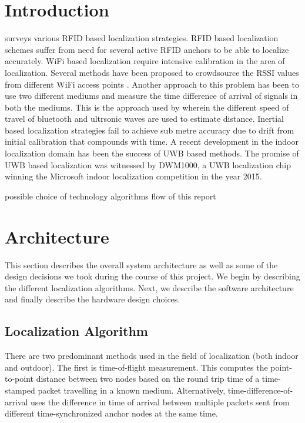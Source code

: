 \documentclass[journal,transmag]{IEEEtran}
\begin{document}
\section{Introduction}

\cite{bouet2008rfid} surveys various RFID based localization strategies. RFID based localization schemes suffer from need for several active RFID anchors to be able to localize accurately. WiFi based localization require intensive calibration in the area of localization. Several methods have been proposed to crowdsource the RSSI values from different WiFi access points \cite{yang2012locating}. Another approach to this problem has been to use two different mediums and measure the time difference of arrival of signals in both the mediums. This is the approach used by \cite{alps} wherein the different speed of travel of bluetooth and ultrsonic waves are used to estimate distance. Inertial based localization strategies \cite{li2012reliable} fail to achieve sub metre accuracy due to drift from initial calibration that compounds with time. A recent development in the indoor localization domain has been the success of UWB based methods\cite{uwb}. The promise of UWB based localization was witnessed by DWM1000, a UWB localization chip winning the Microsoft indoor localization competition in the year 2015.


possible choice of technology
algorithms
flow of this report

\section{Architecture}
This section describes the overall system architecture as well as some of the design decisions we took during the course of this project.  We begin by describing the different localization algorithms.  Next, we describe the software architecture and finally describe the hardware design choices.   
\subsection{Localization Algorithm}
There are two predominant methods used in the field of localization (both indoor and outdoor).  The first is time-of-flight measurement. This computes the point-to-point distance between two nodes based on the round trip time of a time-stamped packet travelling in a known medium. Alternatively, time-difference-of-arrival uses the difference in time of arrival between multiple packets sent from different time-synchronized anchor nodes at the same time.
\end{document}
